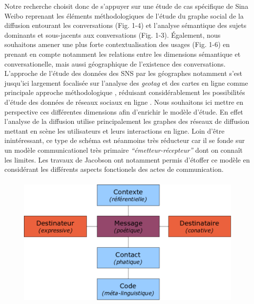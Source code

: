 Notre recherche choisit donc de s{\textquoteright}appuyer sur une
\'etude de cas sp\'ecifique de Sina Weibo reprenant les \'el\'ements
m\'ethodologiques de l{\textquoteright}\'etude du graphe social de la
diffusion entourant les conversations (Fig. 1-4) et
l{\textquoteright}analyse s\'emantique des sujets dominants et
sous-jacents aux conversations (Fig. 1-3). \'Egalement, nous souhaitons
amener une plus forte contextualisation des usages (Fig. 1-6) en
prenant en compte notamment les relations entre les dimensions
s\'emantique et conversationelle, mais aussi g\'eographique de
l{\textquoteright}existence des conversations.
L{\textquoteright}approche de l{\textquoteright}\'etude des donn\'ees
des SNS par les g\'eographes notamment s{\textquoteright}est
jusqu{\textquoteright}ici largement focalis\'ee sur
l{\textquoteright}analyse des \textit{geotag} et des cartes en ligne
comme principale approche m\'ethodologique \citep{Graham2011,
Poorthuis2013}, r\'eduisant consid\'erablement les
possibilit\'es d{\textquoteright}\'etude des donn\'ees de r\'eseaux
sociaux en ligne \citep{Crampton2013}. Nous souhaitons ici mettre en
perspective ces diff\'erentes dimensions afin
d{\textquoteright}enrichir le mod\`ele d{\textquoteright}\'etude. En
effet l{\textquoteright}analyse de la diffusion utilise principalement
les graphes des r\'eseaux de diffusion mettant en sc\`ene les
utilisateurs et leurs interactions en ligne. Loin
d{\textquoteright}\^etre inint\'eressant, ce type de sch\'ema est
n\'eanmoins tr\`es r\'educteur car il se fonde sur un mod\`ele
communicationel tr\`es primaire
\textit{{\textquotedblleft}\'emetteur-r\'ecepteur{\textquotedblright}
}dont on conna\^it les limites. Les travaux de Jacobson ont notamment
permis d{\textquoteright}\'etoffer ce mod\`ele en consid\'erant les
diff\'erents aspects fonctionels des actes de communication.



\begin{figure}
    \centering

    \includegraphics[width=4.6894in,height=2.6114in]{figures/chap3/chapitre3-img5.png}


\end{figure}

